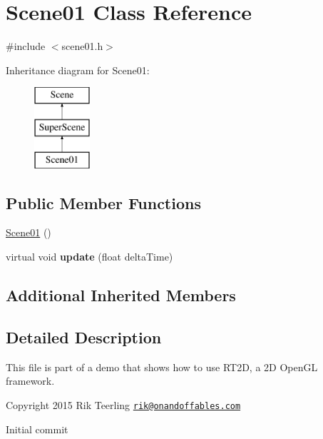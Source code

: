 \hypertarget{class_scene01}{}\section{Scene01 Class Reference}
\label{class_scene01}


{\ttfamily \#include $<$scene01.\+h$>$}

Inheritance diagram for Scene01\+:\begin{figure}[H]
\begin{center}
\leavevmode
\includegraphics[height=3.000000cm]{class_scene01}
\end{center}
\end{figure}
\subsection*{Public Member Functions}
\begin{DoxyCompactItemize}
\item 
\hyperlink{class_scene01_aa485d27ddea0a312ce76a36f18417b93}{Scene01} ()
\item 
\mbox{\label{class_scene01_a8ce3d409ab61628aadeb26202d1686f7}} 
virtual void {\bfseries update} (float delta\+Time)
\end{DoxyCompactItemize}
\subsection*{Additional Inherited Members}


\subsection{Detailed Description}
This file is part of a demo that shows how to use R\+T2D, a 2D Open\+GL framework.


\begin{DoxyItemize}
\item Copyright 2015 Rik Teerling \href{mailto:rik@onandoffables.com}{\tt rik@onandoffables.\+com}
\begin{DoxyItemize}
\item Initial commit 
\end{DoxyItemize}
\end{DoxyItemize}

